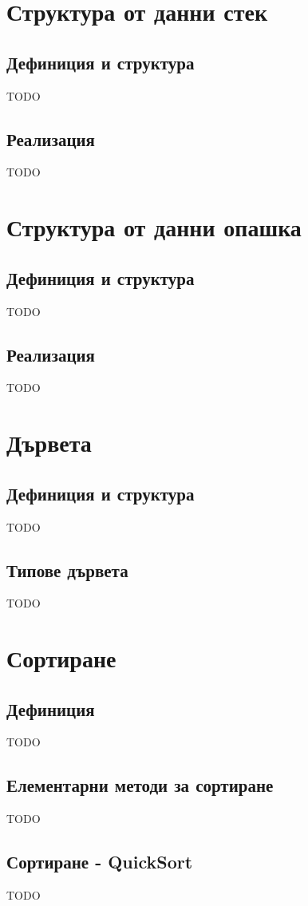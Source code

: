 \documentclass[fleqn,12pt]{article}
\begin{document}
\section{Структура от данни стек}
\subsection{Дефиниция и структура}
TODO

\subsection{Реализация}
TODO

\section{Структура от данни опашка}
\subsection{Дефиниция и структура}
TODO

\subsection{Реализация}
TODO

\section{Дървета}
\subsection{Дефиниция и структура}
TODO

\subsection{Типове дървета}
TODO

\section{Сортиране}
\subsection{Дефиниция}
TODO

\subsection{Елементарни методи за сортиране}
TODO

\subsection{Сортиране - QuickSort}
TODO
\end{document}

